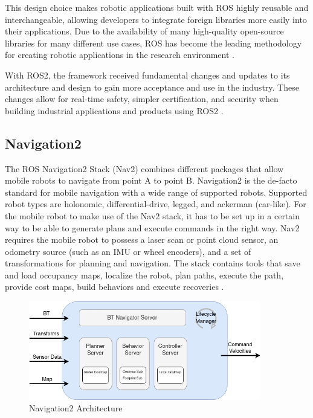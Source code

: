 This design choice makes robotic applications built with ROS highly reusable and interchangeable, allowing developers to integrate foreign libraries more easily into their applications. Due to the availability of many high-quality open-source libraries for many different use cases, ROS has become the leading methodology for creating robotic applications in the research environment \cite{quigley2009}. 

With ROS2, the framework received fundamental changes and updates to its architecture and design to gain more acceptance and use in the industry. These changes allow for real-time safety, simpler certification, and security when building industrial applications and products using ROS2 \cite{ros2022}. 

\subsection{Navigation2}

The ROS Navigation2 Stack (Nav2) combines different packages that allow mobile robots to navigate from point A to point B. Navigation2 is the de-facto standard for mobile navigation with a wide range of supported robots. Supported robot types are holonomic, differential-drive, legged, and ackerman (car-like). For the mobile robot to make use of the Nav2 stack, it has to be set up in a certain way to be able to generate plans and execute commands in the right way. Nav2 requires the mobile robot to possess a laser scan or point cloud sensor, an odometry source (such as an IMU or wheel encoders), and a set of transformations for planning and navigation. 
The stack contains tools that save and load occupancy maps, localize the robot, plan paths, execute the path, provide cost maps, build behaviors and execute recoveries \cite{macenski2020}. 


\begin{figure}[ht]
	\centering
	\includegraphics[width=0.9\textwidth]{images/nav2_architecture.png}
	\caption{Navigation2 Architecture \cite{macenski2020}}
	\label{fig:nav_architecture}
\end{figure}


